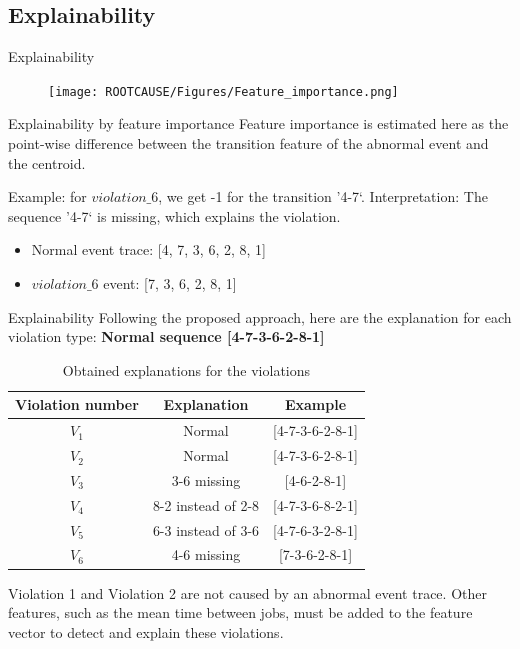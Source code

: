 \documentclass{beamer}
\begin{document}
\subsection{Explainability}
\begin{frame}{Explainability} %
\begin{figure}
    \texttt{[image: ROOTCAUSE/Figures/Feature\_importance.png]}
\end{figure}

\begin{block}{Explainability by feature importance}
Feature importance is estimated here as the point-wise difference between the transition feature of the abnormal event and the centroid. 
\end{block}

Example: for $violation\_6$, we get -1 for the transition '4-7‘. Interpretation:  The sequence '4-7‘ is missing, which explains the violation. \\
\begin{itemize}
    \item Normal event trace: [4, 7, 3, 6, 2, 8, 1]
    \item $violation\_6$ event: [7, 3, 6, 2, 8, 1]
\end{itemize}


\end{frame}

\begin{frame}{Explainability}
Following the proposed approach, here are the explanation for each violation type: 
\textbf{Normal sequence [4-7-3-6-2-8-1]}
\begin{table}[]
    \centering
    \begin{tabular}{c|c|c}
         Violation number& Explanation & Example  \\
         \hline
         $V_1$& Normal &[4-7-3-6-2-8-1] \\
         \rowcolor[HTML]{C0C0C0}$V_2$& Normal &[4-7-3-6-2-8-1]  \\
         $V_3$& 3-6 missing & [4-6-2-8-1] \\
         \rowcolor[HTML]{C0C0C0}$V_4$& 8-2 instead of 2-8&[4-7-3-6-8-2-1] \\
         $V_5$& 6-3 instead of 3-6&[4-7-6-3-2-8-1] \\
         \rowcolor[HTML]{C0C0C0}$V_6$& 4-6 missing & [7-3-6-2-8-1] \\
         
    \end{tabular}
    \caption{Obtained explanations for the violations}
    \label{tab:my_label}
\end{table}
Violation 1 and Violation 2 are not caused by an abnormal event trace. Other features, such as the mean time between jobs, must be added to the feature vector to detect and explain these violations. 
\end{frame}
\end{document}
